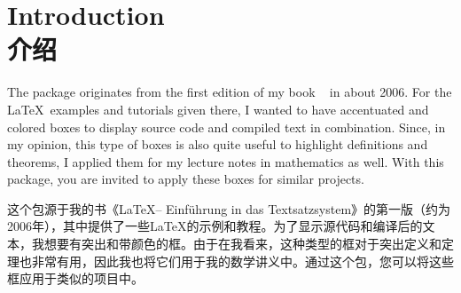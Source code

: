 
\section{Introduction\\介绍}%
%



The package originates from %
the first edition of my book %
\frqq~%
in about 2006.%
For the \LaTeX\ examples and tutorials given there, %
I wanted to have accentuated and colored boxes to display source code and
compiled text in combination.%
Since, in my opinion, %
this type of boxes is also quite useful to highlight definitions and theorems,%
I applied them for my lecture notes in mathematics %
as well.%
With this package, you are invited to apply these boxes for similar projects.

这个包源于我的书《\LaTeX -- Einführung in das Textsatzsystem》的第一版（约为2006年），其中提供了一些\LaTeX 的示例和教程。为了显示源代码和编译后的文本，我想要有突出和带颜色的框。由于在我看来，这种类型的框对于突出定义和定理也非常有用，因此我也将它们用于我的数学讲义中。通过这个包，您可以将这些框应用于类似的项目中。

